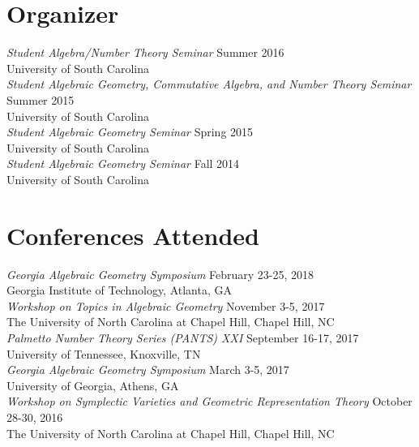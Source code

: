 \documentclass{article}
\begin{document}
  \newpage
  \section*{Organizer}
  \textsl{Student Algebra/Number Theory Seminar} \hfill Summer 2016\\
  University of South Carolina\\
  
  \noindent\textsl{Student Algebraic Geometry, Commutative Algebra, and Number Theory Seminar} \hfill Summer 2015\\
  University of South Carolina\\
  
  \noindent\textsl{Student Algebraic Geometry Seminar} \hfill Spring 2015\\
  University of South Carolina\\

  \noindent\textsl{Student Algebraic Geometry Seminar} \hfill Fall 2014\\
  University of South Carolina
  
  \section*{Conferences Attended}
  \textsl{Georgia Algebraic Geometry Symposium} \hfill February 23-25, 2018\\
  Georgia Institute of Technology, Atlanta, GA\\
  
  \noindent\textsl{Workshop on Topics in Algebraic Geometry} \hfill November 3-5, 2017\\
  The University of North Carolina at Chapel Hill, Chapel Hill, NC\\
  
  \noindent\textsl{Palmetto Number Theory Series (PANTS) XXI} \hfill September 16-17, 2017\\
  University of Tennessee, Knoxville, TN\\
  
  \noindent\textsl{Georgia Algebraic Geometry Symposium} \hfill March 3-5, 2017\\
  University of Georgia, Athens, GA\\

  \noindent\textsl{Workshop on Symplectic Varieties and Geometric Representation Theory} \hfill October 28-30, 2016\\
  The University of North Carolina at Chapel Hill, Chapel Hill, NC\\
  
\end{document}

